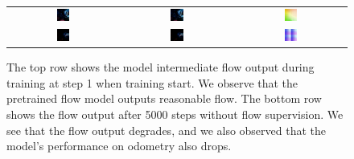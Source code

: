 \documentclass[11pt,a4paper]{article}
\begin{document}
\begin{figure}[h!]
    \centering
    \begin{tabular}{ccc} %
        \includegraphics[width=0.12\textwidth]{Reports/4-Final-Report/images/flow_supervision/step_1_1.png} & 
        \includegraphics[width=0.12\textwidth]{Reports/4-Final-Report/images/flow_supervision/step_1_2.png} & 
        \includegraphics[width=0.12\textwidth]{Reports/4-Final-Report/images/flow_supervision/good_flow.png}\\ 
        
        \includegraphics[width=0.12\textwidth]{Reports/4-Final-Report/images/flow_supervision/step5000_1.png} & 
        \includegraphics[width=0.12\textwidth]{Reports/4-Final-Report/images/flow_supervision/step_5000_2.png} & 
        \includegraphics[width=0.12\textwidth]{Reports/4-Final-Report/images/flow_supervision/bad_flow.png}\\ 
    \end{tabular}
    \caption{The top row shows the model intermediate flow output during training at step 1 when training start. We observe that the pretrained flow model outputs reasonable flow. The bottom row shows the flow output after 5000 steps without flow supervision. We see that the flow output degrades, and we also observed that the model's performance on odometry also drops.}
    \label{fig:flow_supervision}
\end{figure}
\end{document}

